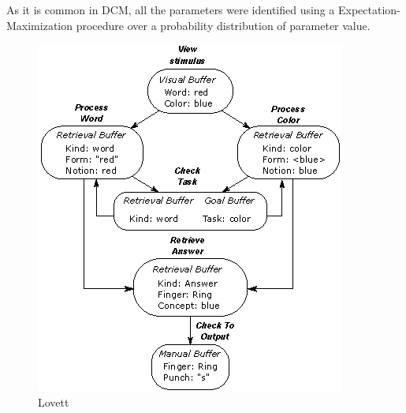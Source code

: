\documentclass[10pt,letterpaper]{article}
\begin{document}
As it is common in DCM, all the parameters were identified using a Expectation-Maximization procedure over a probability distribution of parameter value. 

\begin{figure}[ht]
\centering
  \includegraphics[width=\linewidth]{lovett_model.eps}
  \caption{Lovett}
\end{figure}%
\end{document}
